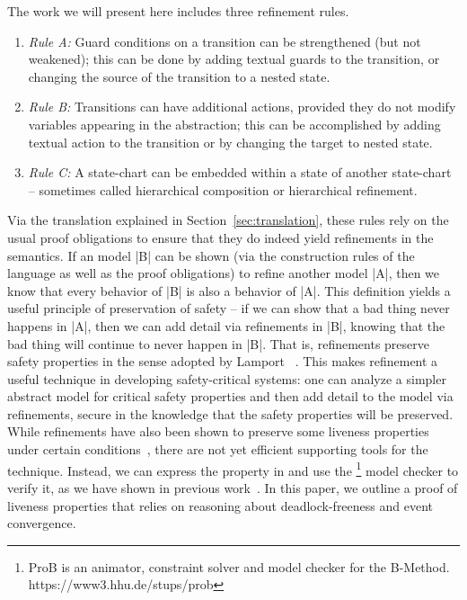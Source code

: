 

The work we will present here includes three refinement rules.
\begin{enumerate}
\item  \emph{Rule A:} Guard conditions on a transition can be strengthened (but not weakened); 
this can be done by adding textual guards to the transition, or
changing the source of the transition to a nested state.
\item \emph{Rule B:} Transitions can have additional actions, provided they do not
  modify variables appearing in the abstraction; this can be 
  accomplished by adding textual action to the transition 
  or by changing the target to nested state.
\item \emph{Rule C:} A state-chart can be embedded within a state of another
  state-chart -- sometimes called hierarchical composition or
  hierarchical refinement.
\end{enumerate}
Via the translation explained in Section~\ref{sec:translation}, these
rules rely on the usual \EventB proof obligations to ensure that they
do indeed yield refinements in the \EventB semantics.  If an \EventB
model |B| can be shown (via the construction rules of the \EventB
language as well as the proof obligations) to refine another \EventB
model |A|, then we know that every behavior of |B| is also a behavior
of |A|. This definition yields a useful principle of preservation of
safety -- if we can show that a bad thing never happens in |A|, then
we can add detail via refinements in |B|, knowing that the bad thing
will continue to never happen in |B|. That is, \EventB refinements
preserve safety properties in the sense adopted by Lamport
~\cite{lamport1977proving}. This makes refinement a useful technique
in developing safety-critical systems: one can analyze a simpler
abstract model for critical safety properties and then add detail to
the model via refinements, secure in the knowledge that the safety
properties will be preserved. While \EventB refinements have also been
shown to preserve some liveness properties under certain
conditions~\cite{hoang2016ltl}, there are not yet efficient supporting
tools for the technique. Instead, we can express the property in \LTL
and use the \PROB\footnote{ProB is an animator, constraint solver and
  model checker for the B-Method. https://www3.hhu.de/stups/prob}
model checker to verify it, as we have shown in previous
work~\cite{detect2020}.  In this paper, we outline a proof of liveness
properties that relies on reasoning about deadlock-freeness and event
convergence.


